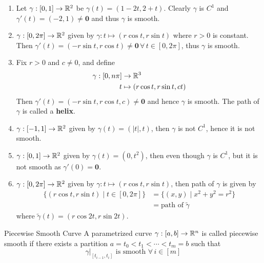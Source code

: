\documentclass[../Analysis-3.tex]{subfiles}
\begin{document}
\begin{Eg}{}{}
  \begin{enumerate}
    \item Let $\gamma : [0,1] \to \mathbb{R}^2$ be $\gamma(t) = (1-2t,2+t)$. Clearly $\gamma$ is $C^1$ and $\gamma'(t) = (-2,1) \neq \mathbf{0}$ and thus $\gamma$ is smooth.

    \item $\gamma : [0,2\pi] \to \mathbb{R}^2$ given by $\gamma : t \mapsto (r \cos t, r \sin t)$ where $r > 0$ is constant. Then $\gamma'(t) = (-r\sin t, r \cos t) \neq \mathbf{0} \, \forall \, t \in [0,2\pi]$, thus $\gamma$ is smooth.

    \item Fix $r > 0$ and $c \neq 0$, and define
          \begin{align*}
            \gamma : [0, n\pi] & \to \mathbb{R}^3                       \\
            t                  & \mapsto (r\cos t, r\sin t, ct)
          \end{align*}
          Then $\gamma'(t) = ( -r\sin t, r \cos t, c ) \neq \mathbf{0}$ and hence $\gamma$ is smooth. The path of $\gamma$ is called a \textbf{helix}.

    \item $\gamma : [-1,1] \to \mathbb{R}^2$ given by $\gamma(t) = (|t|, t)$, then $\gamma$ is not $C^1$, hence it is not smooth.
    \item $\gamma : [0,1] \to \mathbb{R}^2$ given by $\gamma(t) = (0,t^2)$, then even though $\gamma$ is $C^1$, but it is not smooth as $\gamma'(0) = \mathbf{0}$.
    \item $\gamma : [0,2\pi] \to \mathbb{R}^2$ given by $\gamma : t \mapsto (r\cos t, r\sin t)$, then path of $\gamma$ is given by
          \begin{align*}
            \{ (r\cos t, r\sin t) \mid t \in [0,2\pi] \} & = \{ (x,y) \mid x^2 + y^2 = r^2\} \\
                                                         & = \mbox{path of } \tilde{\gamma}
          \end{align*}
          where $\tilde{\gamma}(t) = (r \cos 2t, r \sin 2t)$.
  \end{enumerate}
\end{Eg}

\begin{Def}{Piecewise Smooth Curve}{}
  A parametrized curve $\gamma : [a,b] \to \mathbb{R}^n$ is called piecewise smooth if there exists a partition $a = t_0 < t_1 < \cdots < t_m = b $ such that
  \[
    \gamma\vert_{[t_{i-1}, t_i]} \mbox{ is smooth } \forall \, i \in [m]
  \]
\end{Def}
\end{document}
